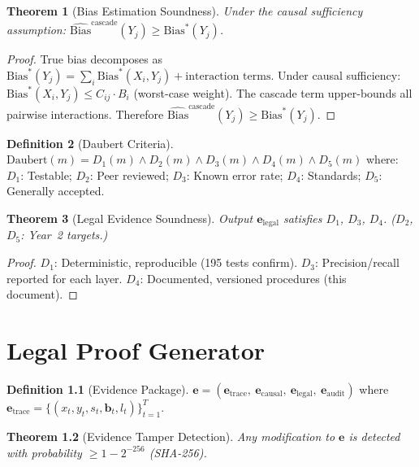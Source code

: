 \documentclass[12pt,a4paper]{report}
\theoremstyle{plain}
\newtheorem{theorem}{Theorem}[chapter]
\theoremstyle{definition}
\newtheorem{definition}[theorem]{Definition}
\theoremstyle{remark}
\newcommand{\casc}{^{\text{cascade}}}
\newcommand{\truebias}{\text{Bias}^*}
\newcommand{\estbias}{\widehat{\text{Bias}}}
\begin{document}
\begin{theorem}[Bias Estimation Soundness]
\label{thm:bias-sound}
Under the causal sufficiency assumption:
$\estbias\casc(Y_j) \geq \truebias(Y_j)$.
\end{theorem}
\begin{proof}
True bias decomposes as
$\truebias(Y_j) = \sum_i \truebias(X_i,Y_j)
+ \text{interaction terms}$.
Under causal sufficiency:
$\truebias(X_i,Y_j) \leq C_{ij} \cdot B_i$
(worst-case weight).
The cascade term upper-bounds all pairwise interactions.
Therefore $\estbias\casc(Y_j) \geq \truebias(Y_j)$.
\end{proof}

\begin{definition}[Daubert Criteria]
$\text{Daubert}(m) = D_1(m) \wedge D_2(m) \wedge
D_3(m) \wedge D_4(m) \wedge D_5(m)$ where:
$D_1$: Testable;
$D_2$: Peer reviewed;
$D_3$: Known error rate;
$D_4$: Standards;
$D_5$: Generally accepted.
\end{definition}

\begin{theorem}[Legal Evidence Soundness]
\label{thm:legal-sound}
Output $\mathbf{e}_{\text{legal}}$ satisfies $D_1$, $D_3$, $D_4$.
($D_2$, $D_5$: Year~2 targets.)
\end{theorem}
\begin{proof}
$D_1$: Deterministic, reproducible (195 tests confirm).
$D_3$: Precision/recall reported for each layer.
$D_4$: Documented, versioned procedures (this document).
\end{proof}

\chapter{Legal Proof Generator}
\label{ch:legal}

\begin{definition}[Evidence Package]
$\mathbf{e} = (\mathbf{e}_{\text{trace}},\
\mathbf{e}_{\text{causal}},\ \mathbf{e}_{\text{legal}},\
\mathbf{e}_{\text{audit}})$
where $\mathbf{e}_{\text{trace}}
= \{(x_t, y_t, s_t, \mathbf{b}_t, l_t)\}_{t=1}^T$.
\end{definition}

\begin{theorem}[Evidence Tamper Detection]
Any modification to $\mathbf{e}$ is detected with
probability $\geq 1 - 2^{-256}$ (SHA-256).
\end{theorem}
\end{document}

